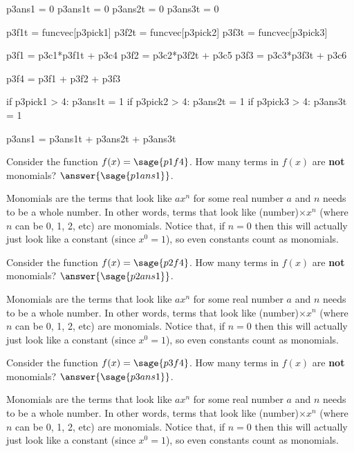 \documentclass{ximera}
\begin{document}
\begin{sagesilent}
p3ans1 = 0
p3ans1t = 0
p3ans2t = 0
p3ans3t = 0

p3f1t = funcvec[p3pick1]
p3f2t = funcvec[p3pick2]
p3f3t = funcvec[p3pick3]

p3f1 = p3c1*p3f1t + p3c4
p3f2 = p3c2*p3f2t + p3c5
p3f3 = p3c3*p3f3t + p3c6

p3f4 = p3f1 + p3f2 + p3f3

if p3pick1 > 4:
    p3ans1t = 1
if p3pick2 > 4:
    p3ans2t = 1
if p3pick3 > 4:
    p3ans3t = 1

p3ans1 = p3ans1t + p3ans2t + p3ans3t



\end{sagesilent}

\begin{problem}
    Consider the function $f(x) = \sage{p1f4}$. How many terms in $f(x)$ are \textbf{not} monomials? $\answer{\sage{p1ans1}}$.
    \begin{feedback}
        Monomials are the terms that look like $ax^n$ for some real number $a$ and $n$ needs to be a whole number. In other words, terms that look like (number)$\times x^n$ (where $n$ can be 0, 1, 2, etc) are monomials. Notice that, if $n=0$ then this will actually just look like a constant (since $x^0=1$), so even constants count as monomials.
    \end{feedback}
\end{problem}

\begin{problem}
Consider the function $f(x) = \sage{p2f4}$. How many terms in $f(x)$ are \textbf{not} monomials? $\answer{\sage{p2ans1}}$.
    \begin{feedback}
        Monomials are the terms that look like $ax^n$ for some real number $a$ and $n$ needs to be a whole number. In other words, terms that look like (number)$\times x^n$ (where $n$ can be 0, 1, 2, etc) are monomials. Notice that, if $n=0$ then this will actually just look like a constant (since $x^0=1$), so even constants count as monomials.
    \end{feedback}
\end{problem}

\begin{problem}
Consider the function $f(x) = \sage{p3f4}$. How many terms in $f(x)$ are \textbf{not} monomials? $\answer{\sage{p3ans1}}$.
    \begin{feedback}
        Monomials are the terms that look like $ax^n$ for some real number $a$ and $n$ needs to be a whole number. In other words, terms that look like (number)$\times x^n$ (where $n$ can be 0, 1, 2, etc) are monomials. Notice that, if $n=0$ then this will actually just look like a constant (since $x^0=1$), so even constants count as monomials.
    \end{feedback}
\end{problem}
\end{document}
